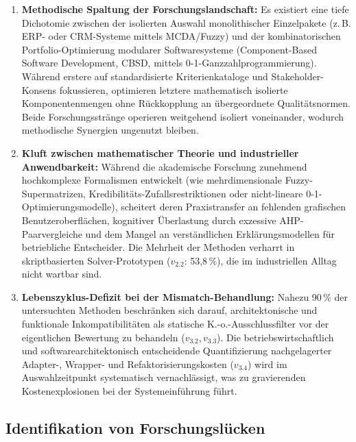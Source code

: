 \begin{enumerate}[label=\textbf{\Roman*.}]
  \item \textbf{Methodische Spaltung der Forschungslandschaft:} Es existiert eine tiefe Dichotomie zwischen der isolierten Auswahl monolithischer Einzelpakete (z.\,B. ERP- oder CRM-Systeme mittels MCDA/Fuzzy) und der kombinatorischen Portfolio-Optimierung modularer Softwaresysteme (Component-Based Software Development, CBSD, mittels 0-1-Ganzzahlprogrammierung). Während erstere auf standardisierte Kriterienkataloge und Stakeholder-Konsens fokussieren, optimieren letztere mathematisch isolierte Komponentenmengen ohne Rückkopplung an übergeordnete Qualitätsnormen. Beide Forschungsstränge operieren weitgehend isoliert voneinander, wodurch methodische Synergien ungenutzt bleiben.
  \item \textbf{Kluft zwischen mathematischer Theorie und industrieller Anwendbarkeit:} Während die akademische Forschung zunehmend hochkomplexe Formalismen entwickelt (wie mehrdimensionale Fuzzy-Supermatrizen, Kredibilitäts-Zufalls\-restriktionen oder nicht-lineare 0-1-Optimierungsmodelle), scheitert deren Praxistransfer an fehlenden grafischen Benutzeroberflächen, kognitiver Überlastung durch exzessive AHP-Paarvergleiche und dem Mangel an verständlichen Erklärungsmodellen für betriebliche Entscheider. Die Mehrheit der Methoden verharrt in skriptbasierten Solver-Prototypen ($v_{2.2}$: 53,8\,\%), die im industriellen Alltag nicht wartbar sind.
  \item \textbf{Lebenszyklus-Defizit bei der Mismatch-Behandlung:} Nahezu 90\,\% der untersuchten Methoden beschränken sich darauf, architektonische und funktionale Inkompatibilitäten als statische K.-o.-Ausschlussfilter vor der eigentlichen Bewertung zu behandeln ($v_{3.2}, v_{3.3}$). Die betriebswirtschaftlich und softwarearchitektonisch entscheidende Quantifizierung nachgelagerter Adapter-, Wrapper- und Refaktorisierungskosten ($v_{3.4}$) wird im Auswahlzeitpunkt systematisch vernachlässigt, was zu gravierenden Kostenexplosionen bei der Systemeinführung führt.
\end{enumerate}

\subsection{Identifikation von Forschungslücken}
\label{subsec:identifikation_forschungsluecken}

